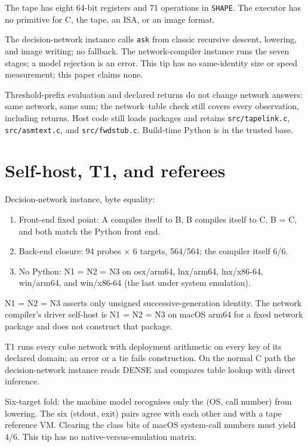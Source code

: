 \documentclass[11pt]{article}
\begin{document}
The tape has eight 64-bit registers and 71 operations in \texttt{SHAPE}. The executor has no primitive for C, the tape, an ISA, or an image format.

The decision-network instance calls \texttt{ask} from classic recursive descent, lowering, and image writing; no fallback. The network-compiler instance runs the seven stages; a model rejection is an error. This tip has no same-identity size or speed measurement; this paper claims none.

Threshold-prefix evaluation and declared returns do not change network answers: same network, same sum; the network--table check still covers every observation, including returns. Host code still loads packages and retains \texttt{src/tapelink.c}, \texttt{src/asmtext.c}, and \texttt{src/fwdstub.c}. Build-time Python is in the trusted base.

\section{Self-host, T1, and referees}\label{implementation}

Decision-network instance, byte equality:

\begin{enumerate}
\item Front-end fixed point: A compiles itself to B, B compiles itself to C, B = C, and both match the Python front end.
\item Back-end closure: 94 probes $\times$ 6 targets, 564/564; the compiler itself 6/6.
\item No Python: N1 = N2 = N3 on osx/arm64, lnx/arm64, lnx/x86-64, win/arm64, and win/x86-64 (the last under system emulation).
\end{enumerate}

N1 = N2 = N3 asserts only unsigned successive-generation identity. The network compiler's driver self-host is N1 = N2 = N3 on macOS arm64 for a fixed network package and does not construct that package.

T1 runs every cube network with deployment arithmetic on every key of its declared domain; an error or a tie fails construction. On the normal C path the decision-network instance reads DENSE and compares table lookup with direct inference.

Six-target fold: the machine model recognises only the (OS, call number) from lowering. The six (stdout, exit) pairs agree with each other and with a tape reference VM. Clearing the class bits of macOS system-call numbers must yield 4/6. This tip has no native-versus-emulation matrix.
\end{document}
